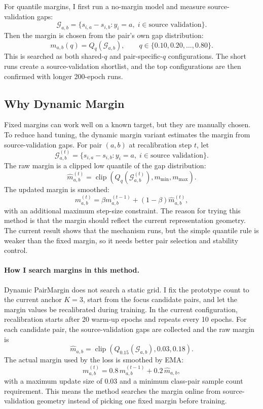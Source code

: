 \documentclass[11pt]{article}
\begin{document}
For quantile margins, I first run a no-margin model and measure source-validation gaps:
\[
\mathcal{G}_{a,b}
=
\{s_{i,a}-s_{i,b}: y_i=a,\; i\in\text{source validation}\}.
\]
Then the margin is chosen from the pair's own gap distribution:
\[
m_{a,b}(q)=Q_q(\mathcal{G}_{a,b}),\qquad
q\in\{0.10,0.20,\dots,0.80\}.
\]
This is searched as both shared-$q$ and pair-specific-$q$ configurations. The short runs create a source-validation shortlist, and the top configurations are then confirmed with longer 200-epoch runs.

\subsection{Why Dynamic Margin}

Fixed margins can work well on a known target, but they are manually chosen. To reduce hand tuning, the dynamic margin variant estimates the margin from source-validation gaps. For pair $(a,b)$ at recalibration step $t$, let
\[
\mathcal{G}_{a,b}^{(t)}
=
\{s_{i,a}-s_{i,b}: y_i=a,\; i \in \text{source validation}\}.
\]
The raw margin is a clipped low quantile of the gap distribution:
\[
\widehat{m}_{a,b}^{(t)}
=
\operatorname{clip}
\left(
Q_q(\mathcal{G}_{a,b}^{(t)}),
m_{\min},
m_{\max}
\right).
\]
The updated margin is smoothed:
\[
m_{a,b}^{(t)}
=
\beta m_{a,b}^{(t-1)}
+
(1-\beta)\widehat{m}_{a,b}^{(t)},
\]
with an additional maximum step-size constraint. The reason for trying this method is that the margin should reflect the current representation geometry. The current result shows that the mechanism runs, but the simple quantile rule is weaker than the fixed margin, so it needs better pair selection and stability control.

\paragraph{How I search margins in this method.}
Dynamic PairMargin does not search a static grid. I fix the prototype count to the current anchor $K=3$, start from the focus candidate pairs, and let the margin values be recalibrated during training. In the current configuration, recalibration starts after 20 warm-up epochs and repeats every 10 epochs. For each candidate pair, the source-validation gaps are collected and the raw margin is
\[
\widehat{m}_{a,b}
=
\operatorname{clip}
\left(
Q_{0.15}(\mathcal{G}_{a,b}),
0.03,
0.18
\right).
\]
The actual margin used by the loss is smoothed by EMA:
\[
m_{a,b}^{(t)}
=
0.8\,m_{a,b}^{(t-1)}
+
0.2\,\widehat{m}_{a,b},
\]
with a maximum update size of $0.03$ and a minimum class-pair sample count requirement. This means the method searches the margin online from source-validation geometry instead of picking one fixed margin before training.
\end{document}
